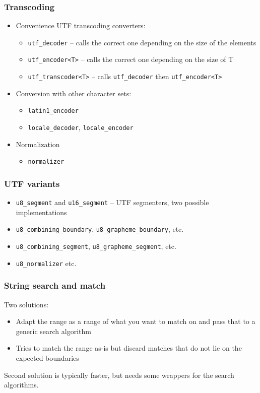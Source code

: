 \documentclass{beamer}
\begin{document}
\begin{frame}
	\frametitle{Transcoding}
	
	\begin{itemize}
	\item Convenience UTF transcoding converters:
	\begin{itemize}
		\item \lstinline{utf_decoder} -- calls the correct one depending on the size of the elements
		\item \lstinline{utf_encoder<T>} -- calls the correct one depending on the size of T
		\item \lstinline{utf_transcoder<T>} -- calls \lstinline{utf_decoder} then \lstinline{utf_encoder<T>}
	\end{itemize}
	
	\item Conversion with other character sets:
	\begin{itemize}
		\item \lstinline{latin1_encoder}
		\item \lstinline{locale_decoder}, \lstinline{locale_encoder}
	\end{itemize}
	
	\item Normalization
	\begin{itemize}
		\item \lstinline{normalizer}
	\end{itemize}
	
	\end{itemize}
	
\end{frame}

\begin{frame}
	\frametitle{UTF variants}
	
	\begin{itemize}
		\item \lstinline{u8_segment} and \lstinline{u16_segment} -- UTF segmenters, two possible implementations
		\item \lstinline{u8_combining_boundary}, \lstinline{u8_grapheme_boundary}, etc.
		\item \lstinline{u8_combining_segment}, \lstinline{u8_grapheme_segment}, etc.
		\item \lstinline{u8_normalizer} etc.
	\end{itemize}
	
\end{frame}

\begin{frame}
	\frametitle{String search and match}
	
	Two solutions:
	\begin{itemize}
		\item Adapt the range as a range of what you want to match on and pass that to a generic
		      search algorithm
		\item Tries to match the range as-is but discard matches that do not lie on the expected boundaries
	\end{itemize}
	
	Second solution is typically faster, but needs some wrappers for the search algorithms.
	
\end{frame}
	
\end{document}
